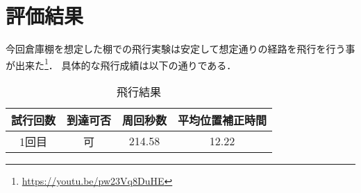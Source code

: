 \section{評価結果}
今回倉庫棚を想定した棚での飛行実験は安定して想定通りの経路を飛行を行う事が出来た\footnote{\url{https://youtu.be/pw23Vq8DuHE}}．
具体的な飛行成績は以下の通りである．

\begin{table}[h]
    \caption{飛行結果}
    \label{table:fly_result}
    \centering
    \begin{tabular}{cccc}
        \hline
        試行回数 & 到達可否 & 周回秒数 & 平均位置補正時間 \\
        \hline \hline
        1回目 & 可 & 214.58 & 12.22 \\
        \hline
    \end{tabular}
\end{table}